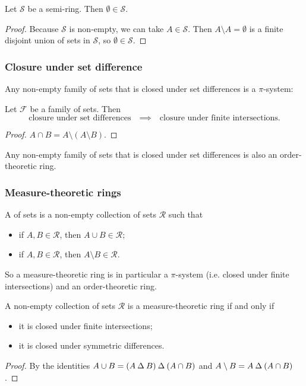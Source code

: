 \begin{lemma}
Let $\mathcal{S}$ be a semi-ring. Then $\emptyset \in \mathcal{S}$.
\end{lemma}
\begin{proof}
Because $\mathcal{S}$ is non-empty, we can take $A\in \mathcal{S}$. Then $A\setminus A = \emptyset$ is a finite disjoint union of sets in $\mathcal{S}$, so $\emptyset \in \mathcal{S}$.
\end{proof}

\subsubsection{Closure under set difference}
Any non-empty family of sets that is closed under set differences is a $\pi$-system:
\begin{lemma}
Let $\mathcal{F}$ be a family of sets. Then
\[ \text{closure under set differences} \quad\implies\quad \text{closure under finite intersections.} \]
\end{lemma}
\begin{proof}
$A\cap B = A\setminus (A\setminus B)$.
\end{proof}

Any non-empty family of sets that is closed under set differences is also an order-theoretic ring.

\subsubsection{Measure-theoretic rings}
\begin{definition}
A  of sets is a non-empty collection of sets $\mathcal{R}$ such that
\begin{itemize}
\item if $A,B\in \mathcal{R}$, then $A\cup B\in \mathcal{R}$;
\item if $A,B\in \mathcal{R}$, then $A\setminus B\in \mathcal{R}$.
\end{itemize}
\end{definition}
So a measure-theoretic ring is in particular a $\pi$-system (i.e. closed under finite intersections) and an order-theoretic ring.

\begin{lemma}
A non-empty collection of sets $\mathcal{R}$ is a measure-theoretic ring \textup{if and only if}
\begin{itemize}
\item it is closed under finite intersections;
\item it is closed under symmetric differences.
\end{itemize}
\end{lemma}
\begin{proof}
By the identities $A\cup B = (A\mathbin{\Delta} B)\mathbin{\Delta} (A\cap B)$ and $A\setminus B = A\mathbin{\Delta} (A\cap B)$.
\end{proof}

